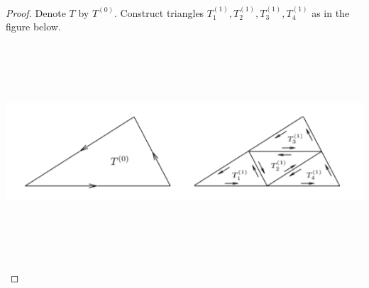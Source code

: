 \documentclass{report}
\begin{document}
\begin{proof}
Denote $T$ by $T^{(0)}$. Construct triangles $T_1^{(1)},T_2^{(1)},T_3^{(1)},T_4^{(1)}$ as in the figure below. \\

\begin{center}
   \begin{minipage}{0.9\linewidth}  
       \centering       
\includegraphics[height=8cm,width=16cm]{triangle.png} 
   \end{minipage}
\end{center}


\end{proof}
\end{document}
